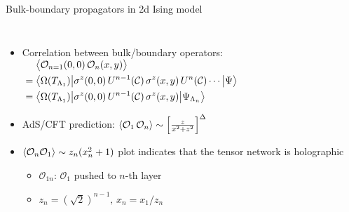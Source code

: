 \documentclass{fdubeamer}
\begin{document}
\begin{frame}{Bulk-boundary propagators in 2d Ising model}

\begin{columns}[T]


    \begin{itemize}
      \item Correlation between bulk/boundary operators: \\[-2ex]
        \begingroup
          \small
          \mbox{\quad}
          $
            \begin{aligned}
              &\mathrel{\phantom{=}}
                 \ev[\big]{\mathcal{O}_{n=1}(0,0) \, \mathcal{O}_n(x,y)} \\
              &= \bigl\langle \Omega(T_{\Lambda_1}) \big|
                 \sigma^z(0,0) \, U^{n-1}(\mathcal{C}) \, \sigma^z(x,y) \, U^n(\mathcal{C}) \cdots
                 \big| \Psi \bigr\rangle \\
              &= \bigl\langle \Omega(T_{\Lambda_1}) \big|
                 \sigma^z(0,0) \, U^{n-1}(\mathcal{C}) \, \sigma^z(x,y)
                 \big| \Psi_{\Lambda_n} \bigr\rangle
            \end{aligned}
          $
        \endgroup
      \item AdS/CFT prediction: $\ev{\mathcal{O}_1 \, \mathcal{O}_n} \sim \left[ \frac{z}{x^2+z^2} \right]^\Delta$
      \item $\ev{\mathcal{O}_n\mathcal{O}_1} \sim z_n(x_n^2+1)$ plot indicates that the tensor network is holographic

        \begin{itemize}
          \item $\mathcal{O}_{1n}$: $\mathcal{O}_1$ pushed to $n$-th layer
          \item $z_n=(\sqrt{2})^{n-1}, \, x_n=x_1/z_n$
        \end{itemize}
    \end{itemize}



\end{columns}
\end{frame}
\end{document}
